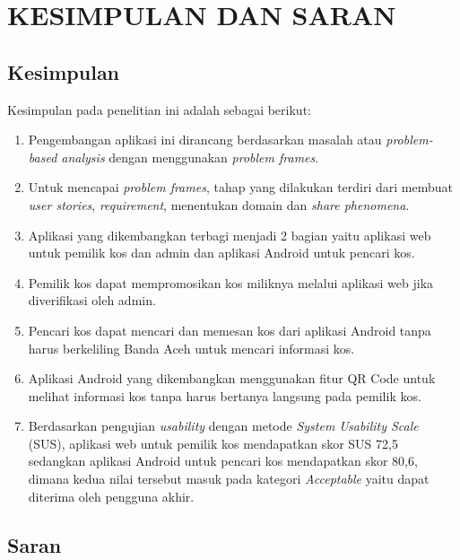 
\chapter{KESIMPULAN DAN SARAN}

\section{Kesimpulan}
	Kesimpulan pada penelitian ini adalah sebagai berikut:

	\begin{enumerate}
		\item Pengembangan aplikasi ini dirancang berdasarkan masalah atau \textit{problem-based analysis} dengan menggunakan \textit{problem frames}. 
		\item Untuk mencapai \textit{problem frames}, tahap yang dilakukan terdiri dari membuat \textit{user stories}, \textit{requirement}, menentukan domain dan \textit{share phenomena}.
		\item Aplikasi yang dikembangkan terbagi menjadi 2 bagian yaitu aplikasi web untuk pemilik kos dan admin dan aplikasi Android untuk pencari kos. 
		\item Pemilik kos dapat mempromosikan kos miliknya melalui aplikasi web jika diverifikasi oleh admin.
		\item Pencari kos dapat mencari dan memesan kos dari aplikasi Android tanpa harus berkeliling Banda Aceh untuk mencari informasi kos.
		\item Aplikasi Android yang dikembangkan menggunakan fitur QR Code untuk melihat informasi kos tanpa harus bertanya langsung pada pemilik kos.
		\item Berdasarkan pengujian \textit{usability} dengan metode \textit{System Usability Scale} (SUS), aplikasi web untuk pemilik kos mendapatkan skor SUS 72,5 sedangkan aplikasi Android untuk pencari kos mendapatkan skor 80,6, dimana kedua nilai tersebut masuk pada kategori \textit{Acceptable} yaitu dapat diterima oleh pengguna akhir.
		
	\end{enumerate}


\section{Saran}

